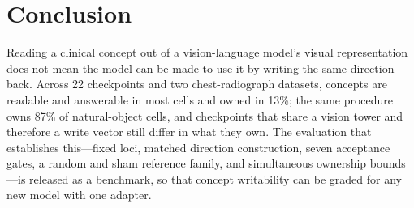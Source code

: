 \section{Conclusion}
\label{sec:conclusion}

Reading a clinical concept out of a vision-language model's visual representation does not mean the model can be made to use it by writing the same direction back. Across 22 checkpoints and two chest-radiograph datasets, concepts are readable and answerable in most cells and owned in 13\%; the same procedure owns 87\% of natural-object cells, and checkpoints that share a vision tower and therefore a write vector still differ in what they own. The evaluation that establishes this---fixed loci, matched direction construction, seven acceptance gates, a random and sham reference family, and simultaneous ownership bounds---is released as a benchmark, so that concept writability can be graded for any new model with one adapter.
